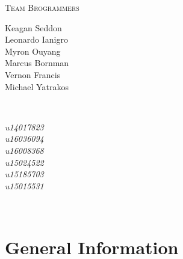 \documentclass[12pt]{article}
\begin{document}
\begin{titlepage}
\textsc{\large Team Brogrammers}\\[0.5cm]

\begin{minipage}{0.4\textwidth}
\begin{flushleft} \large
{Keagan Seddon}\\
{Leonardo Ianigro}\\
{Myron Ouyang}\\
{Marcus Bornman}\\
{Vernon Francis}\\
{Michael Yatrakos}
\end{flushleft}
\end{minipage}
~
\begin{minipage}{0.4\textwidth}
\begin{flushright} \large
\emph{u14017823} \\
\emph{u16036094} \\
\emph{u16008368} \\
\emph{u15024522} \\
\emph{u15185703} \\
\emph{u15015531} \\
\end{flushright}
\end{minipage}\\[2cm]

\vfill %

\end{titlepage}

\section{General Information}
\end{document}
